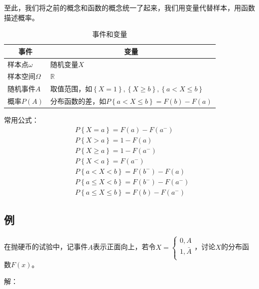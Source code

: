 至此，我们将之前的概念和函数的概念统一了起来，我们用变量代替样本，用函数描述概率。
\begin{table}[h]
\centering
\caption{事件和变量}
\begin{tabular}{ll}
    \toprule
    \multicolumn{1}{c}{事件} & \multicolumn{1}{c}{变量}  \\
    \midrule
    样本点$\omega $ & 随机变量$X$\\
    样本空间$\varOmega $ & $\mathbb{R} $\\
    随机事件$A$ & 取值范围，如$\left\{ X=1 \right\} ,\left\{ X\geqslant b \right\} ,\left\{ a<X\leqslant b \right\} $\\
    概率$P\left( A \right) $ & 分布函数的差，如$P\left\{ a<X\leqslant b \right\} =F\left( b \right) -F\left( a \right) $\\
    \bottomrule
\end{tabular}
\end{table}

常用公式：
\begin{align*}
&P\left\{ X=a \right\} =F\left( a \right) -F\left( a^- \right) \\
&P\left\{ X>a \right\} =1-F\left( a \right) \\
&P\left\{ X\geqslant a \right\} =1-F\left( a^- \right) \\
&P\left\{ X<a \right\} =F\left( a^- \right) \\
&P\left\{ a<X<b \right\} =F\left( b^- \right) -F\left( a \right) \\
&P\left\{ a\leqslant X<b \right\} =F\left( b^- \right) -F\left( a^- \right) \\
&P\left\{ a\leqslant X\leqslant b \right\} =F\left( b \right) -F\left( a^- \right)
\end{align*}

\subsection{例}

\begin{example}
在抛硬币的试验中，记事件$A$表示正面向上，若令$X=\begin{cases}
	0,A\\
	1,\bar{A}\\
\end{cases}$，讨论$X$的分布函数$F\left( x \right) $。
\end{example}

解：

